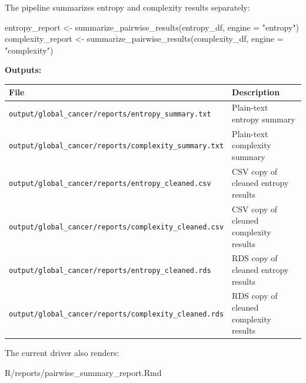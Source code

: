 \documentclass[
  letterpaper,
  DIV=11,
  numbers=noendperiod,
  openany,
  oneside]{scrreprt}
\newenvironment{Shaded}{\begin{snugshade}}{\end{snugshade}}
\newcommand{\AttributeTok}[1]{\textcolor[rgb]{0.40,0.45,0.13}{#1}}
\newcommand{\FunctionTok}[1]{\textcolor[rgb]{0.28,0.35,0.67}{#1}}
\newcommand{\NormalTok}[1]{\textcolor[rgb]{0.00,0.23,0.31}{#1}}
\newcommand{\OtherTok}[1]{\textcolor[rgb]{0.00,0.23,0.31}{#1}}
\newcommand{\SpecialCharTok}[1]{\textcolor[rgb]{0.37,0.37,0.37}{#1}}
\newcommand{\StringTok}[1]{\textcolor[rgb]{0.13,0.47,0.30}{#1}}
\begin{document}
The pipeline summarizes entropy and complexity results separately:

\begin{Shaded}
\begin{Highlighting}[]
\NormalTok{entropy\_report    }\OtherTok{\textless{}{-}} \FunctionTok{summarize\_pairwise\_results}\NormalTok{(entropy\_df, }\AttributeTok{engine =} \StringTok{"entropy"}\NormalTok{)}
\NormalTok{complexity\_report }\OtherTok{\textless{}{-}} \FunctionTok{summarize\_pairwise\_results}\NormalTok{(complexity\_df, }\AttributeTok{engine =} \StringTok{"complexity"}\NormalTok{)}
\end{Highlighting}
\end{Shaded}

\textbf{Outputs:}

\begin{longtable}[]{@{}
  >{\raggedright\arraybackslash}p{}
  >{\raggedright\arraybackslash}p{}@{}}
\toprule\noalign{}
\begin{minipage}[b]{\linewidth}\raggedright
File
\end{minipage} & \begin{minipage}[b]{\linewidth}\raggedright
Description
\end{minipage} \\
\midrule\noalign{}
\endhead
\bottomrule\noalign{}
\endlastfoot
\texttt{output/global\_cancer/reports/entropy\_summary.txt} & Plain-text
entropy summary \\
\texttt{output/global\_cancer/reports/complexity\_summary.txt} &
Plain-text complexity summary \\
\texttt{output/global\_cancer/reports/entropy\_cleaned.csv} & CSV copy
of cleaned entropy results \\
\texttt{output/global\_cancer/reports/complexity\_cleaned.csv} & CSV
copy of cleaned complexity results \\
\texttt{output/global\_cancer/reports/entropy\_cleaned.rds} & RDS copy
of cleaned entropy results \\
\texttt{output/global\_cancer/reports/complexity\_cleaned.rds} & RDS
copy of cleaned complexity results \\
\end{longtable}

The current driver also renders:

\begin{Shaded}
\begin{Highlighting}[]
\NormalTok{R}\SpecialCharTok{/}\NormalTok{reports}\SpecialCharTok{/}\NormalTok{pairwise\_summary\_report.Rmd}
\end{Highlighting}
\end{Shaded}
\end{document}
